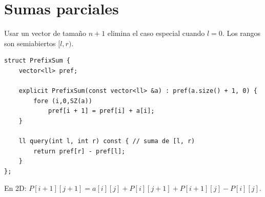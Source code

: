 \section{Sumas parciales}

Usar un vector de tama\~no $n+1$ elimina el caso especial cuando $l=0$.
Los rangos son semiabiertos $[l,r)$.


\begin{lstlisting}[style=cpp]
struct PrefixSum {
    vector<ll> pref;

    explicit PrefixSum(const vector<ll> &a) : pref(a.size() + 1, 0) {
        fore (i,0,SZ(a))
            pref[i + 1] = pref[i] + a[i];
    }

    ll query(int l, int r) const { // suma de [l, r)
        return pref[r] - pref[l];
    }
};
\end{lstlisting}

En 2D: $P[i+1][j+1]=a[i][j]+P[i][j+1]+P[i+1][j]-P[i][j]$.
